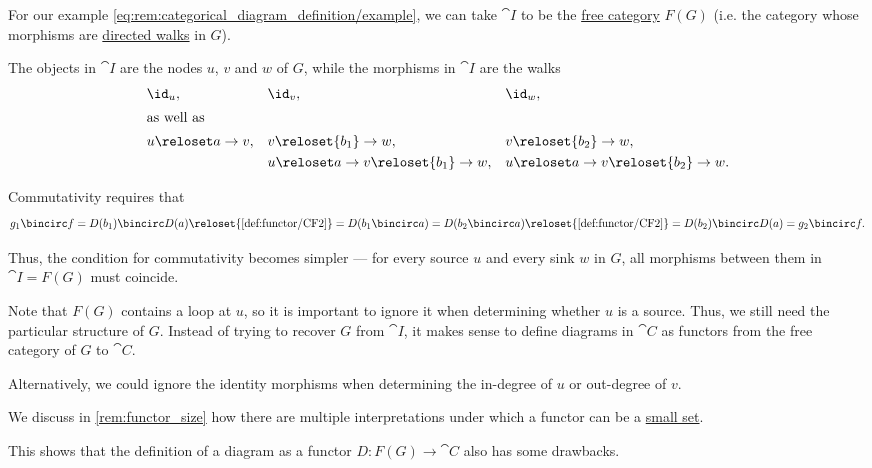 \begin{remark}
\begin{thmenum}
    For our example \eqref{eq:rem:categorical_diagram_definition/example}, we can take \( \cat{I} \) to be the \hyperref[def:free_category]{free category} \( F(G) \) (i.e. the category whose morphisms are \hyperref[def:graph_walk/directed]{directed walks} in \( G \)).

    The objects in \( \cat{I} \) are the nodes \( u \), \( v \) and \( w \) of \( G \), while the morphisms in \( \cat{I} \) are the walks
    \begin{align*}
      &\id_u,                                   && \id_v,                                   && \id_w, \\
    \intertext{as well as}
      &u \reloset a \to v,                      && v \reloset {b_1} \to w,                  && v \reloset {b_2} \to w, \\
      &                                         && u \reloset a \to v \reloset {b_1} \to w, && u \reloset a \to v \reloset {b_2} \to w.
    \end{align*}

    Commutativity requires that
    \begin{equation*}
      g_1 \bincirc f
      =
      D(b_1) \bincirc D(a)
      \reloset {\ref{def:functor/CF2}} =
      D(b_1 \bincirc a)
      =
      D(b_2 \bincirc a)
      \reloset {\ref{def:functor/CF2}} =
      D(b_2) \bincirc D(a)
      =
      g_2 \bincirc f.
    \end{equation*}

    Thus, the condition for commutativity becomes simpler --- for every source \( u \) and every sink \( w \) in \( G \), all morphisms between them in \( \cat{I} = F(G) \) must coincide.

    Note that \( F(G) \) contains a loop at \( u \), so it is important to ignore it when determining whether \( u \) is a source. Thus, we still need the particular structure of \( G \). Instead of trying to recover \( G \) from \( \cat{I} \), it makes sense to define diagrams in \( \cat{C} \) as functors from the free category of \( G \) to \( \cat{C} \).

    Alternatively, we could ignore the identity morphisms when determining the in-degree of \( u \) or out-degree of \( v \).

     We discuss in \cref{rem:functor_size} how there are multiple interpretations under which a functor can be a \hyperref[def:small_set]{small set}.

    This shows that the definition of a diagram as a functor \( D: F(G) \to \cat{C} \) also has some drawbacks.


\end{thmenum}
\end{remark}
